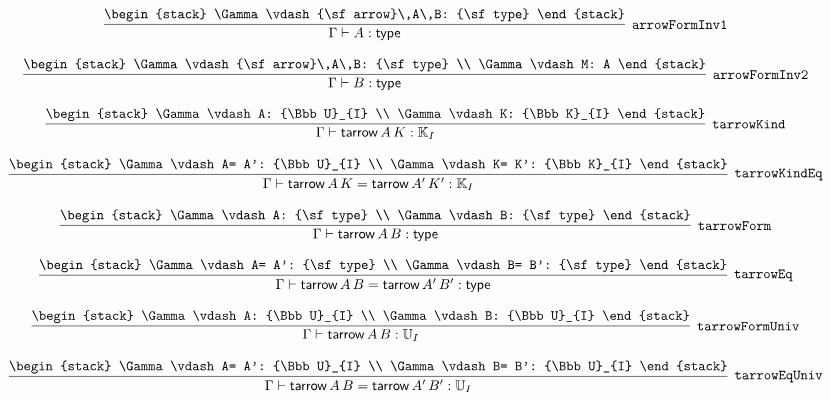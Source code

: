 \[
\infer[{\tt arrowFormInv1}]{\Gamma \vdash A: {\sf type}}{
\begin{stack}
\Gamma \vdash {\sf arrow}\,A\,B: {\sf type}
\end{stack}}
\]

\[
\infer[{\tt arrowFormInv2}]{\Gamma \vdash B: {\sf type}}{
\begin{stack}
\Gamma \vdash {\sf arrow}\,A\,B: {\sf type}
\\
\Gamma \vdash M: A
\end{stack}}
\]

\[
\infer[{\tt tarrowKind}]{\Gamma \vdash {\sf tarrow}\,A\,K: {\Bbb K}_{I}}{
\begin{stack}
\Gamma \vdash A: {\Bbb U}_{I}
\\
\Gamma \vdash K: {\Bbb K}_{I}
\end{stack}}
\]

\[
\infer[{\tt tarrowKindEq}]{\Gamma \vdash {\sf tarrow}\,A\,K= {\sf tarrow}\,A'\,K': {\Bbb K}_{I}}{
\begin{stack}
\Gamma \vdash A= A': {\Bbb U}_{I}
\\
\Gamma \vdash K= K': {\Bbb K}_{I}
\end{stack}}
\]

\[
\infer[{\tt tarrowForm}]{\Gamma \vdash {\sf tarrow}\,A\,B: {\sf type}}{
\begin{stack}
\Gamma \vdash A: {\sf type}
\\
\Gamma \vdash B: {\sf type}
\end{stack}}
\]

\[
\infer[{\tt tarrowEq}]{\Gamma \vdash {\sf tarrow}\,A\,B= {\sf tarrow}\,A'\,B': {\sf type}}{
\begin{stack}
\Gamma \vdash A= A': {\sf type}
\\
\Gamma \vdash B= B': {\sf type}
\end{stack}}
\]

\[
\infer[{\tt tarrowFormUniv}]{\Gamma \vdash {\sf tarrow}\,A\,B: {\Bbb U}_{I}}{
\begin{stack}
\Gamma \vdash A: {\Bbb U}_{I}
\\
\Gamma \vdash B: {\Bbb U}_{I}
\end{stack}}
\]

\[
\infer[{\tt tarrowEqUniv}]{\Gamma \vdash {\sf tarrow}\,A\,B= {\sf tarrow}\,A'\,B': {\Bbb U}_{I}}{
\begin{stack}
\Gamma \vdash A= A': {\Bbb U}_{I}
\\
\Gamma \vdash B= B': {\Bbb U}_{I}
\end{stack}}
\]

